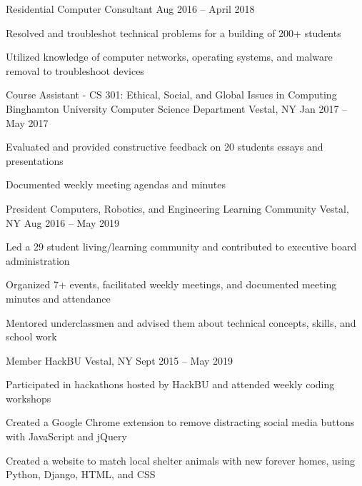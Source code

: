 \documentclass[]{awesome-cv}
\begin{document}
\begin{cventries}
{\begin{cvitems}
	\end{cvitems}}
	\cventry
	{Residential Computer Consultant}
	{} %
	{} %
	{Aug 2016 – April 2018}
	{\begin{cvitems}
		\item {Resolved and troubleshot technical problems for a building of 200+ students}
		\item {Utilized knowledge of computer networks, operating systems, and malware removal to troubleshoot devices}
	\end{cvitems}}
	\cventry
	{Course Assistant - CS 301: Ethical, Social, and Global Issues in Computing}
	{Binghamton University Computer Science Department}
	{Vestal, NY}
	{Jan 2017 – May 2017}
	{\begin{cvitems}
		\item {Evaluated and provided constructive feedback on 20 students\textquotesingle{} essays and presentations}
		\item {Documented weekly meeting agendas and minutes}
	\end{cvitems}}
\end{cventries}
\vspace{-2mm}

\begin{cventries}
	\cventry
    {President}
	{Computers, Robotics, and Engineering Learning Community}
	{Vestal, NY}
	{Aug 2016 – May 2019}
	{\begin{cvitems}
		\item {Led a 29 student living/learning community and contributed to executive board administration}
		\item {Organized 7+ events, facilitated weekly meetings, and documented meeting minutes and attendance}
        \item {Mentored underclassmen and advised them about technical concepts, skills, and school work}
	\end{cvitems}}
    \cventry
    {Member}
	{HackBU}
	{Vestal, NY}
	{Sept 2015 – May 2019}
	{\begin{cvitems}
		\item {Participated in hackathons hosted by HackBU and attended weekly coding workshops}
		\item {Created a Google Chrome extension to remove distracting social media buttons with JavaScript and jQuery}
        \item {Created a website to match local shelter animals with new forever homes, using Python, Django, HTML, and CSS}
	\end{cvitems}}
\end{cventries}
\vspace{-2mm}
\end{document}
